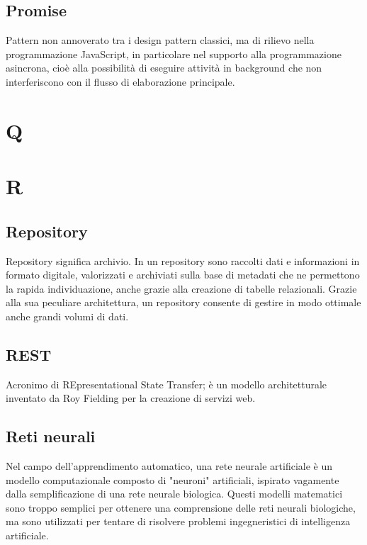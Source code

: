 \subsection*{Promise}
Pattern non annoverato tra i design pattern classici, ma di rilievo nella programmazione JavaScript, in particolare nel supporto alla programmazione asincrona, cioè alla possibilità di eseguire attività in background che non interferiscono con il flusso di elaborazione principale.

\clearpage
\section*{Q}

\clearpage
\section*{R}

\subsection*{Repository}
Repository significa archivio. In un repository sono raccolti dati e informazioni in formato digitale, valorizzati e archiviati sulla base di metadati che ne permettono la rapida individuazione, anche grazie alla creazione di tabelle relazionali. Grazie alla sua peculiare architettura, un repository consente di gestire in modo ottimale anche grandi volumi di dati.

\subsection*{REST}
Acronimo di REpresentational State Transfer; è un modello architetturale inventato da Roy Fielding per la creazione di servizi web.

\subsection*{Reti neurali}
Nel campo dell'apprendimento automatico, una rete neurale artificiale  è un modello computazionale composto di "neuroni" artificiali, ispirato vagamente dalla semplificazione di una rete neurale biologica. Questi modelli matematici sono troppo semplici per ottenere una comprensione delle reti neurali biologiche, ma sono utilizzati per tentare di risolvere problemi ingegneristici di intelligenza artificiale.

